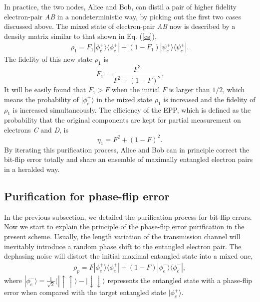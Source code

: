 \documentclass[aps,graphicx,twocolumn]{revtex4}%
\begin{document}
In practice, the two nodes, Alice and Bob, can distil a pair of higher fidelity electron-pair \emph{AB} in a nondeterministic way, by picking out the first two cases discussed above. The mixed state of electron-pair \emph{AB} now is described
by a density matrix similar to that shown in Eq. (\ref{cs}),
\begin{equation}\label{csn}
  \begin{split}
  \rho_1=F_1|\phi^+_e\rangle\langle\phi^+_e|+(1-F_1)|\psi^+_e\rangle\langle\psi^+_e|.
  \end{split}
\end{equation}
The fidelity of this new state $\rho_1$ is
\begin{equation}\label{f1}
F_1=\frac{F^{2}}{F^{2}+(1-F)^{2}}.
\end{equation}
It will be easily found that $F_1>F$ when the initial $F$ is larger than $1/2$, which means the probability of $|\phi^{+}_e\rangle$ in the mixed state $\rho_1$ is increased and the fidelity of $\rho_1$ is increased simultaneously. The efficiency of the EPP, which is defined as the probability that the original components are kept for partial measurement on electrons \emph{C} and \emph{D}, is
\begin{equation}\label{eta1}
\eta_1={F^{2}+(1-F)^{2}}.
\end{equation}
By iterating this purification process, Alice and Bob can in  principle correct the bit-flip error totally and share an ensemble of maximally entangled electron pairs in a heralded way.

\subsection{Purification for phase-flip error}
In the previous subsection, we detailed the purification process for bit-flip errors.
Now we start to explain the principle of the phase-flip error purification in the present scheme. Usually, the length variation of the transmission channel will inevitably introduce a random phase shift to the entangled electron pair. The dephasing noise will distort the initial maximal entangled state into a mixed one,
\begin{equation}\label{csn2}
  \begin{split}
  \rho_p=F|\phi^+_e\rangle\langle\phi^+_e|+(1-F)|\phi^-_e\rangle\langle\phi^-_e|,
  \end{split}
\end{equation}
where  $|\phi^-_e\rangle=\frac{1}{\sqrt{2}}(|\uparrow\uparrow\rangle-|\downarrow\downarrow\rangle$ represents the entangled state with a phase-flip error when compared with the target entangled state  $|\phi^+_e\rangle$.
\end{document}
